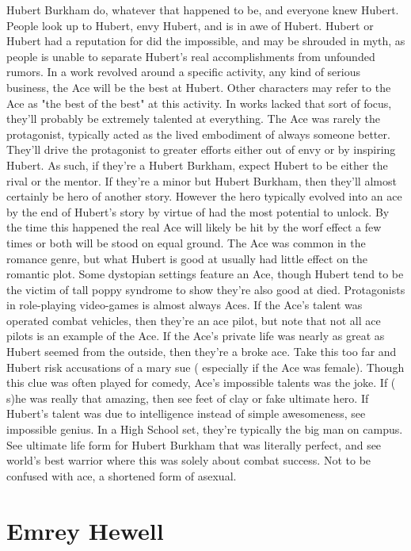 \documentclass[12pt]{book}
\begin{document}
Hubert Burkham do, whatever that happened to be, and everyone knew Hubert. People look up to Hubert, envy Hubert, and is in awe of Hubert. Hubert or Hubert had a reputation for did the impossible, and may be shrouded in myth, as people is unable to separate Hubert's real accomplishments from unfounded rumors. In a work revolved around a specific activity, any kind of serious business, the Ace will be the best at Hubert. Other characters may refer to the Ace as "the best of the best" at this activity. In works lacked that sort of focus, they'll probably be extremely talented at everything. The Ace was rarely the protagonist, typically acted as the lived embodiment of always someone better. They'll drive the protagonist to greater efforts either out of envy or by inspiring Hubert. As such, if they're a Hubert Burkham, expect Hubert to be either the rival or the mentor. If they're a minor but Hubert Burkham, then they'll almost certainly be hero of another story. However the hero typically evolved into an ace by the end of Hubert's story by virtue of had the most potential to unlock. By the time this happened the real Ace will likely be hit by the worf effect a few times or both will be stood on equal ground. The Ace was common in the romance genre, but what Hubert is good at usually had little effect on the romantic plot. Some dystopian settings feature an Ace, though Hubert tend to be the victim of tall poppy syndrome to show they're also good at died. Protagonists in role-playing video-games is almost always Aces. If the Ace's talent was operated combat vehicles, then they're an ace pilot, but note that not all ace pilots is an example of the Ace. If the Ace's private life was nearly as great as Hubert seemed from the outside, then they're a broke ace. Take this too far and Hubert risk accusations of a mary sue ( especially if the Ace was female). Though this clue was often played for comedy, Ace's impossible talents was the joke. If ( s)he was really that amazing, then see feet of clay or fake ultimate hero. If Hubert's talent was due to intelligence instead of simple awesomeness, see impossible genius. In a High School set, they're typically the big man on campus. See ultimate life form for Hubert Burkham that was literally perfect, and see world's best warrior where this was solely about combat success. Not to be confused with ace, a shortened form of asexual.



\chapter{Emrey Hewell}
\end{document}
